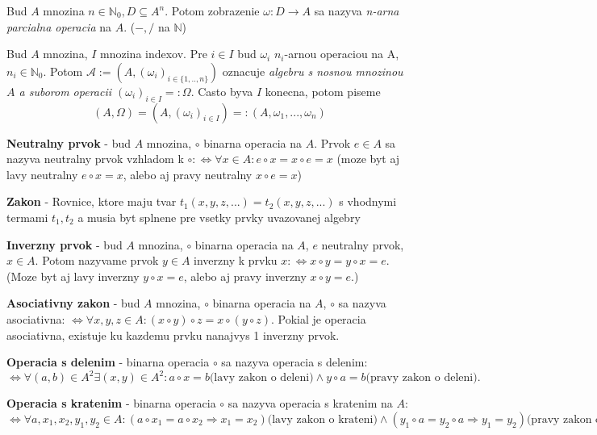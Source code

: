 \documentclass[12pt]{article}
\begin{document}
Bud $A$ mnozina $n \in \mathbb{N}_{0}, D \subseteq A^{n}$. Potom zobrazenie
$\omega: D \to A$ sa nazyva \emph{n-arna parcialna operacia} na $A$. ($-,/$ na $\mathbb{N}$)

Bud $A$ mnozina, $I$ mnozina indexov. Pre $i \in I$ bud $\omega_{i}$ $n_{i}$-arnou operaciou na A,
$n_{i} \in \mathbb{N}_{0}$. Potom $\mathcal{A} := (A, (\omega_{i})_{i \in \{1,..,n\}})$ oznacuje
\emph{algebru s nosnou mnozinou $A$ a suborom operacii $(\omega_{i})_{i \in I} =: \Omega$}.
Casto byva $I$ konecna, potom piseme
\begin{equation*}
	(A,\Omega) = (A, (\omega_{i})_{i \in I}) =: (A, \omega_{1},...,\omega_{n})
\end{equation*}

\textbf{Neutralny prvok} - bud $A$ mnozina, $\circ$ binarna operacia na $A$. Prvok $e \in A$ sa nazyva
neutralny prvok vzhladom k $\circ: \Leftrightarrow \forall x \in A: e \circ x = x \circ e = x$ (moze byt
aj lavy neutralny $e \circ x = x$, alebo aj pravy neutralny $x \circ e = x$)

\textbf{Zakon} - Rovnice, ktore maju tvar $t_{1}(x,y,z,...) = t_{2}(x,y,z,...)$ s vhodnymi termami
$t_{1}, t_{2}$ a musia byt splnene pre vsetky prvky uvazovanej algebry

\textbf{Inverzny prvok} - bud $A$ mnozina, $\circ$ binarna operacia na $A$, $e$ neutralny prvok, $x \in A$. Potom
nazyvame prvok $y \in A$ inverzny k prvku $x: \Leftrightarrow x \circ y = y \circ x = e$. (Moze byt aj lavy inverzny
$y \circ x = e$, alebo aj pravy inverzny $x \circ y = e$.)

\textbf{Asociativny zakon} - bud $A$ mnozina, $\circ$ binarna operacia na $A$, $\circ$ sa nazyva asociativna:
$\Leftrightarrow \forall x,y,z \in A: (x \circ y) \circ z = x \circ (y \circ z)$. Pokial je operacia asociativna,
existuje ku kazdemu prvku nanajvys 1 inverzny prvok.

\textbf{Operacia s delenim} - binarna operacia $\circ$ sa nazyva operacia s delenim: $\Leftrightarrow
\forall (a,b) \in A^{2} \exists (x,y) \in A^{2}: a \circ x = b \text{(lavy zakon o deleni)}
\land y \circ a = b \text{(pravy zakon o deleni)}.$

\textbf{Operacia s kratenim} - binarna operacia $\circ$ sa nazyva operacia s kratenim na $A$:
$\Leftrightarrow \forall a,x_{1},x_{2},y_{1},y_{2} \in A: (a \circ x_{1} = a \circ x_{2} \Rightarrow x_{1} = x_{2}) \text{(lavy zakon o krateni)}
\land (y_{1} \circ a = y_{2} \circ a \Rightarrow y_{1} = y_{2}) \text{(pravy zakon o krateni)}$
\end{document}
